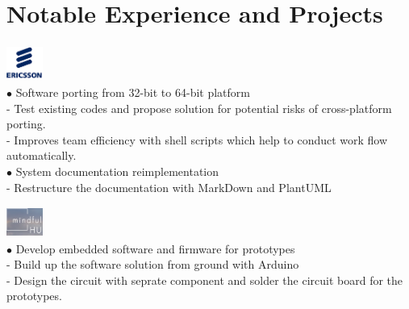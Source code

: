 \documentclass[12pt,a4paper,sans]{moderncv}        %
\begin{document}
\makecvtitle
\vspace{-40pt}
\normalsize
\section{Notable Experience and Projects}
\includegraphics[width=1.2cm,height=1.2cm]{Ericsson}\vspace{-32pt}\\
\hspace*{1.3cm}
{
\hspace*{1.3cm} $\bullet$ Software porting from 32-bit to 64-bit platform\\
\hspace*{1.37cm} - Test existing codes and propose solution for potential risks of cross-platform porting.\\
\hspace*{1.4cm} - Improves team efficiency with shell scripts which help to conduct work flow automatically.\vspace{3pt}\\
\hspace*{1.3cm} $\bullet$ System documentation reimplementation\\
\hspace*{1.37cm} - Restructure the documentation with MarkDown and PlantUML \\
}

\includegraphics[width=1.2cm,height=1cm]{mindfulhu} \vspace{-25pt}\\
\hspace*{1.3cm} 
{
\hspace*{1.3cm} $\bullet$ Develop embedded software and firmware for prototypes \\
\hspace*{1.37cm} - Build up the software solution from ground with Arduino\\
\hspace*{1.4cm} - Design the circuit with seprate component and solder the circuit board for the prototypes.\\
}
\end{document}

